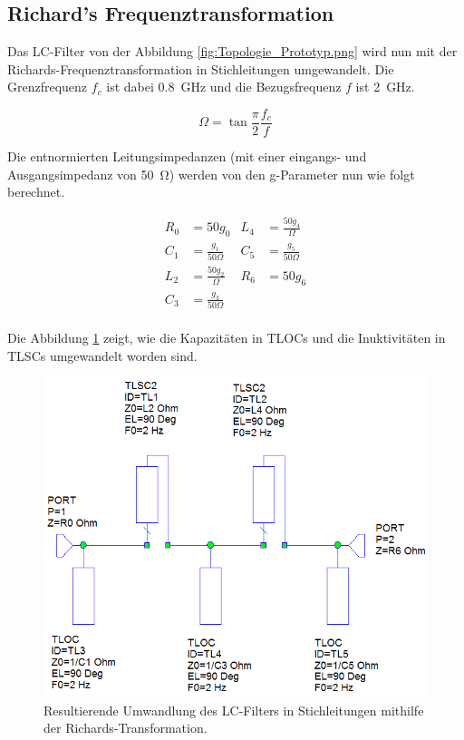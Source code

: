 \subsection{Richard's Frequenztransformation}

Das LC-Filter von der Abbildung  \ref{fig:Topologie_Prototyp.png} wird nun mit
der  Richards-Frequenztransformation   in   Stichleitungen   umgewandelt.  Die
Grenzfrequenz $f_c$ ist dabei \SI{0.8}{\giga\hertz} und die Bezugsfrequenz $f$
ist \SI{2}{\giga\hertz}.

\begin{equation}
    \Omega = \tan\frac{\pi}{2}\frac{f_c}{f}
\end{equation}

Die entnormierten Leitungsimpedanzen (mit einer eingangs- und Ausgangsimpedanz
von  \SI{50}{\ohm}) werden  von  den  g-Parameter  nun  wie  folgt  berechnet.

\begin{align*}
    R_0 &= 50 g_0               & L_4 &= \frac{50g_4}{\Omega} \\ 
    C_1 &= \frac{g_1}{50\Omega} & C_5 &= \frac{g_5}{50\Omega} \\ 
    L_2 &= \frac{50g_2}{\Omega} & R_6 &= 50 g_6               \\ 
    C_3 &= \frac{g_3}{50\Omega} &     &                       \\
\end{align*}

Die  Abbildung  \ref{fig:stripline-richards}  zeigt,  wie die Kapazit\"aten in
TLOCs   und   die   Inuktivit\"aten   in   TLSCs   umgewandelt  worden   sind.

\begin{figure}[h!]
    \centering
    \includegraphics[width=\imagewidth]{images/stripline-richards}
    \caption{Resultierende Umwandlung des LC-Filters in Stichleitungen mithilfe der Richards-Transformation.}
    \label{fig:stripline-richards}
\end{figure}

